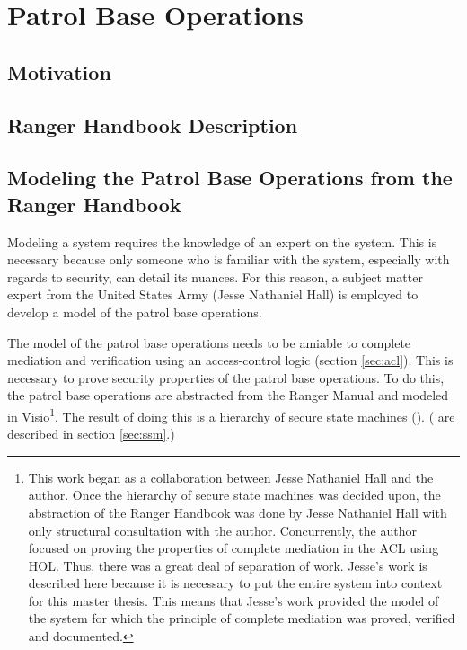 \documentclass[../../main/main.tex]{subfiles}
\begin{document}
\chapter{Patrol Base Operations}
\section{Motivation}

\section{Ranger Handbook Description}

\section{Modeling the Patrol Base Operations from the Ranger Handbook}\label{sec:modelingpb}
\glsresetall[\acronymtype]

Modeling a system requires the knowledge of an expert on the system.  This is necessary because only someone who is familiar with the system, especially with regards to security, can detail its nuances.  For this reason, a subject matter expert from the United States Army (Jesse Nathaniel Hall) is employed to develop a model of the patrol base operations. 

The model of the patrol base operations needs to be amiable to complete mediation and verification using an access-control logic (section \ref{sec:acl}).  This is necessary to prove security properties of the patrol base operations.  To do this, the patrol base operations are abstracted from the Ranger Manual and modeled in Visio\footnote{This work began as a collaboration between Jesse Nathaniel Hall and the author.  Once the hierarchy of secure state machines was decided upon, the abstraction of the Ranger Handbook was done by Jesse Nathaniel Hall with only structural consultation with the author.  Concurrently, the author focused on proving the properties of complete mediation in the ACL using HOL.  Thus, there was a great deal of separation of work.  Jesse's work is described here because it is necessary to put the entire system into context for this master thesis.  This means that Jesse's work provided the model of the system for which the principle of complete mediation was proved, verified and documented.}.  The result of doing this is a hierarchy of secure state machines (). ( are described in section \ref{sec:ssm}.)  
\end{document}
